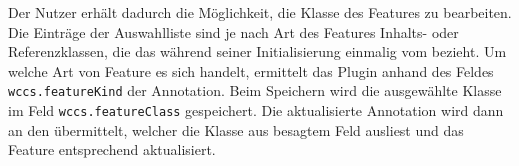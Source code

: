     Der Nutzer erhält dadurch die Möglichkeit, die Klasse des Features zu bearbeiten.
    Die Einträge der Auswahlliste sind je nach Art des Features
    Inhalts- oder Referenzklassen, die das {\annotatorPlugin} während seiner
    Initialisierung einmalig vom {\classificationService}
    bezieht.
    Um welche Art von Feature es sich handelt, ermittelt das Plugin anhand des Feldes
    \texttt{wccs.featureKind} der Annotation.
    Beim Speichern wird die ausgewählte Klasse im Feld \texttt{wccs.featureClass} gespeichert.
    Die aktualisierte Annotation wird dann an den {\annotationService} übermittelt,
    welcher die Klasse aus besagtem Feld ausliest und das Feature entsprechend
    aktualisiert.
